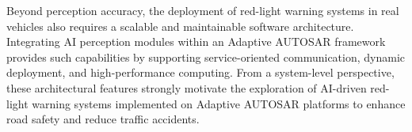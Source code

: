 Beyond perception accuracy, the deployment of red-light warning systems in real vehicles also requires a scalable and maintainable software architecture. Integrating AI perception modules within an Adaptive AUTOSAR framework provides such capabilities by supporting service-oriented communication, dynamic deployment, and high-performance computing. From a system-level perspective, these architectural features strongly motivate the exploration of AI-driven red-light warning systems implemented on Adaptive AUTOSAR platforms to enhance road safety and reduce traffic accidents.
